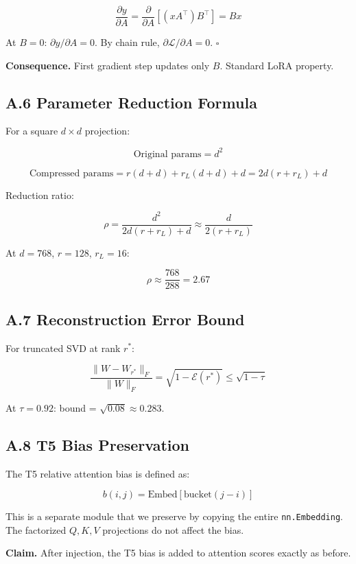 \[
\frac{\partial y}{\partial A} = \frac{\partial}{\partial A} \left[ (x A^\top) B^\top \right] = B x
\tag{A.6}
\]

At $B = 0$: $\partial y / \partial A = 0$. By chain rule, $\partial \mathcal{L} / \partial A = 0$. $\square$

\textbf{Consequence.} First gradient step updates only $B$. Standard LoRA property.

\subsection{A.6 Parameter Reduction Formula}

For a square $d \times d$ projection:

\[
\text{Original params} = d^2
\tag{A.7}
\]

\[
\text{Compressed params} = r(d + d) + r_L(d + d) + d = 2d(r + r_L) + d
\tag{A.7}
\]

Reduction ratio:

\[
\rho = \frac{d^2}{2d(r + r_L) + d} \approx \frac{d}{2(r + r_L)}
\tag{A.8}
\]

At $d = 768$, $r = 128$, $r_L = 16$:

\[
\rho \approx \frac{768}{288} = 2.67
\tag{A.9}
\]

\subsection{A.7 Reconstruction Error Bound}

For truncated SVD at rank $r^*$:

\[
\frac{\|W - W_{r^*}\|_F}{\|W\|_F} = \sqrt{1 - \mathcal{E}(r^*)} \leq \sqrt{1 - \tau}
\tag{A.10}
\]

At $\tau = 0.92$: bound = $\sqrt{0.08} \approx 0.283$.

\subsection{A.8 T5 Bias Preservation}

The T5 relative attention bias is defined as:

\[
b(i, j) = \text{Embed}[\text{bucket}(j - i)]
\tag{A.11}
\]

This is a separate module that we preserve by copying the entire \texttt{nn.Embedding}. 
The factorized $Q, K, V$ projections do not affect the bias.

\textbf{Claim.} After injection, the T5 bias is added to attention scores exactly 
as before.

